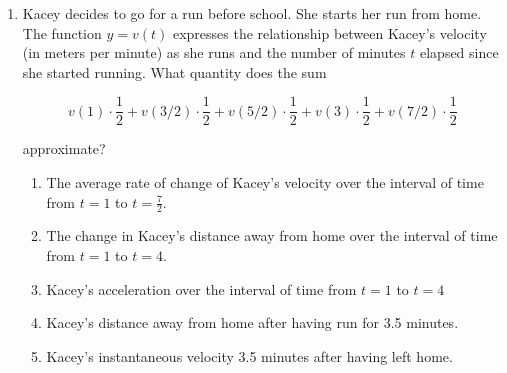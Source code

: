 \documentclass[12pt]{report}
\begin{document}
\begin{enumerate}








\item Kacey decides to go for a run before school. She starts her run from home. The function $y=v(t)$ expresses the relationship between Kacey's velocity (in meters per minute) as she runs and the number of minutes $t$ elapsed since she started running. What quantity does the sum 

$$v(1)\cdot \frac{1}{2}+v\left(3/2\right)\cdot \frac{1}{2}+v\left(5/2\right)\cdot \frac{1}{2}+v\left(3\right)\cdot \frac{1}{2}+v\left(7/2\right)\cdot \frac{1}{2}$$

approximate?

\begin{enumerate}

\item The average rate of change of Kacey's velocity over the interval of time from $ t = 1$ to $t = \frac{7}{2}$.

\item The change in Kacey's distance away from home over the interval of time from $t = 1$ to $t = 4$.

\item Kacey's acceleration over the interval of time from $t=1$ to $t=4$

\item Kacey's distance away from home after having run for 3.5 minutes.

\item Kacey's instantaneous velocity 3.5 minutes after having left home.
\end{enumerate}


\end{enumerate}
\end{document}
